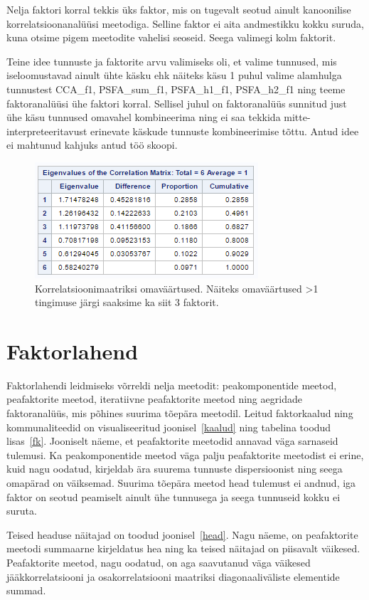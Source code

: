 \documentclass[a4paper,12pt]{report}
\begin{document}
Nelja faktori korral tekkis üks faktor, mis on tugevalt seotud ainult kanoonilise korrelatsioonanalüüsi meetodiga. Selline faktor ei aita andmestikku kokku suruda, kuna otsime pigem meetodite vahelisi seoseid. Seega valimegi kolm faktorit.

Teine idee tunnuste ja faktorite arvu valimiseks oli, et valime tunnused, mis iseloomustavad ainult ühte käsku ehk näiteks käsu 1 puhul valime alamhulga tunnustest CCA\_f1, PSFA\_sum\_f1, PSFA\_h1\_f1, PSFA\_h2\_f1 ning teeme faktoranalüüsi ühe faktori korral. Sellisel juhul on faktoranalüüs sunnitud just ühe käsu tunnused omavahel kombineerima ning ei saa tekkida mitte-interpreteeritavust erinevate käskude tunnuste kombineerimise tõttu. Antud idee ei mahtunud kahjuks antud töö skoopi.

\begin{figure}[h!]
	\centering
	\includegraphics{eigen.png}
	\caption{Korrelatsioonimaatriksi omaväärtused. Näiteks omaväärtused \textgreater 1 tingimuse järgi saaksime ka siit 3 faktorit.}
\end{figure}

\section{Faktorlahend}

Faktorlahendi leidmiseks võrreldi nelja meetodit: peakomponentide meetod, peafaktorite meetod, iteratiivne peafaktorite meetod ning aegridade faktoranalüüs, mis põhines suurima tõepära meetodil. Leitud faktorkaalud ning kommunaliteedid on visualiseeritud joonisel~\ref{kaalud} ning tabelina toodud lisas~\ref{fk}. Jooniselt näeme, et peafaktorite meetodid annavad väga sarnaseid tulemusi. Ka peakomponentide meetod väga palju peafaktorite meetodist ei erine, kuid nagu oodatud, kirjeldab ära suurema tunnuste dispersioonist ning seega omapärad on väiksemad. Suurima tõepära meetod head tulemust ei andnud, iga faktor on seotud peamiselt ainult ühe tunnusega ja seega tunnuseid kokku ei suruta.

Teised headuse näitajad on toodud joonisel~\ref{head}. Nagu näeme, on peafaktorite meetodi summaarne kirjeldatus hea ning ka teised näitajad on piisavalt väikesed. Peafaktorite meetod, nagu oodatud, on aga saavutanud väga väikesed jääkkorrelatsiooni ja osakorrelatsiooni maatriksi diagonaaliväliste elementide summad. 
\end{document}
